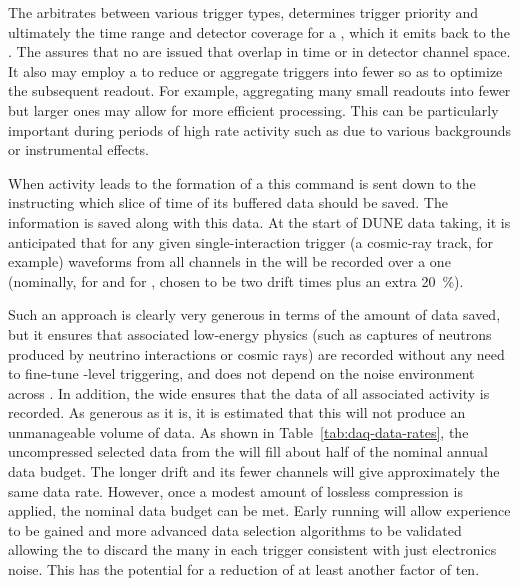 The  arbitrates between various trigger types, determines
trigger priority and ultimately the time range and detector coverage
for a , which it emits back to the .
The  assures that no  are issued that 
overlap in time or in detector channel space.
It also may employ a  to reduce or aggregate triggers into
fewer  so as to optimize the subsequent readout. 
For example, aggregating many small readouts into fewer but larger
ones may allow for more efficient processing.   This can be particularly
important during periods of high rate activity such as due to various
backgrounds or instrumental effects.

When activity leads to the formation of a  this
command is sent down to the  instructing which slice of
time of its buffered data should be saved. 
The  information is saved along with this data. 
At the start of DUNE data taking, it is anticipated that for any given
single-interaction trigger (a cosmic-ray track, for example) waveforms
from all channels in the  will be recorded over a one
 (nominally, \spreadout for  and
\dpreadout for , chosen to be two drift times  plus an
extra \SI{20}{\%}). 

Such an approach is clearly very generous in terms of the amount of
data saved, but it ensures that associated low-energy physics (such as
captures of neutrons produced by neutrino interactions or cosmic rays)
are recorded without any need to fine-tune -level
triggering, and does not depend on the noise environment across
. 
In addition, the wide  ensures that the data of
all associated activity is recorded.
As generous as it is, it is estimated that this 
will not produce an unmanageable volume of data.
As shown in Table~\ref{tab:daq-data-rates}, the uncompressed selected
data from the  will fill about half of the
nominal annual data budget. 
The longer \dual drift and its fewer channels will give approximately the
same data rate. 
However, once a modest amount of lossless compression is applied, the
nominal data budget can be met. 
Early running will allow experience to be gained and more advanced
data selection algorithms to be validated allowing the  to discard
the many  in each trigger consistent
with just electronics noise. 
This has the potential for a reduction of at least another factor of ten.

